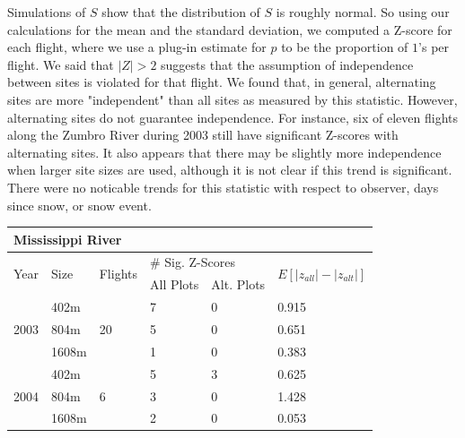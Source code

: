 \documentclass[12pt]{article}
\begin{document}
    Simulations of \(S\) show that the distribution of \(S\) is roughly normal.
    So using our calculations for the mean and the standard deviation, we
    computed a Z-score for each flight, where we use a plug-in estimate for
    \(p\) to be the proportion of \(1\)'s per flight. We said that \(|Z| > 2\) suggests that the assumption of
    independence between sites is violated for that flight. We found that, in
    general, alternating sites are more "independent" than all sites as measured
    by this statistic. However, alternating sites do not guarantee independence.
    For instance, six of eleven flights along the Zumbro River during 2003 still
    have significant Z-scores with alternating sites. It also appears that there 
	may be slightly more independence when larger site sizes are used, although it is
not clear if this trend is significant.  There 
	were no noticable trends for this statistic with respect to observer, days 
	since snow, or snow event.

    \begin{center}
    \begin{tabular}{|l|l|l|l|l|l|}
        \hline
        \multicolumn{6}{|l|}{\textbf{Mississippi River}} \\
        \hline
        \multirow{2}{*}{Year} & \multirow{2}{*}{Size} & \multirow{2}{*}{Flights}
        & \multicolumn{2}{|l|}{\# Sig. Z-Scores} &
        \multirow{2}{*}{\(E[|z_{all}|-|z_{alt}|]\)} \\
        \cline{4-5}
        & & & All Plots & Alt. Plots & \\
        \hline
        \multirow{3}{*}{2003} & 402m & \multirow{3}{*}{20} & 7 & 0 & 0.915 \\
        \cline{2-2} \cline{4-6}
        & 804m & & 5 & 0 & 0.651 \\
        \cline{2-2} \cline{4-6}
        & 1608m & & 1 & 0 & 0.383 \\
        \hline
        \multirow{3}{*}{2004} & 402m & \multirow{3}{*}{6} & 5 & 3 & 0.625 \\
        \cline{2-2} \cline{4-6}
        & 804m & & 3 & 0 & 1.428 \\
        \cline{2-2} \cline{4-6}
        & 1608m & & 2 & 0 & 0.053 \\
        \hline
    \end{tabular}
    \end{center}
\end{document}
